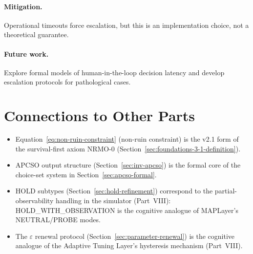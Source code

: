 \paragraph{Mitigation.}
Operational timeouts force escalation, but this is an implementation
choice, not a theoretical guarantee.

\paragraph{Future work.}
Explore formal models of human-in-the-loop decision latency and
develop escalation protocols for pathological cases.

\section*{Connections to Other Parts}

\begin{itemize}
\item Equation~\ref{eq:non-ruin-constraint} (non-ruin constraint) is
the v2.1 form of the survival-first axiom NRMO-0
(Section~\ref{sec:foundations-3-1-definition}).
\item APCSO output structure
(Section~\ref{sec:inv-apcso}) is the formal core of the
choice-set system in
Section~\ref{sec:apcso-formal}.
\item HOLD subtypes
(Section~\ref{sec:hold-refinement}) correspond to the
partial-observability handling in the simulator (Part~VIII):
HOLD\_WITH\_OBSERVATION is the cognitive analogue of MAPLayer's
NEUTRAL/PROBE modes.
\item The $\varepsilon$ renewal protocol
(Section~\ref{sec:parameter-renewal}) is the cognitive analogue of
the Adaptive Tuning Layer's hysteresis mechanism (Part~VIII).
\end{itemize}
